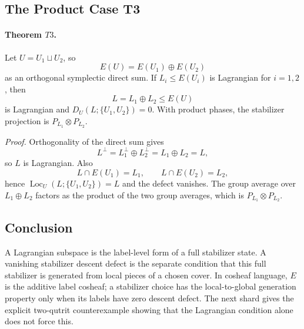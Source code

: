 \subsection{The Product Case T3}

\paragraph{Theorem \(T3\).}
Let \(U=U_1\sqcup U_2\), so
\[
  E(U)=E(U_1)\oplus E(U_2)
\]
as an orthogonal symplectic direct sum.  If \(L_i\leq E(U_i)\) is Lagrangian
for \(i=1,2\), then
\[
  L=L_1\oplus L_2\leq E(U)
\]
is Lagrangian and \(D_U(L;\{U_1,U_2\})=0\).  With product phases, the
stabilizer projection is \(P_{L_1}\otimes P_{L_2}\).

\emph{Proof.}
Orthogonality of the direct sum gives
\[
  L^\perp=L_1^\perp\oplus L_2^\perp=L_1\oplus L_2=L,
\]
so \(L\) is Lagrangian.  Also
\[
  L\cap E(U_1)=L_1,\qquad L\cap E(U_2)=L_2,
\]
hence \(\operatorname{Loc}_U(L;\{U_1,U_2\})=L\) and the defect vanishes.  The
group average over \(L_1\oplus L_2\) factors as the product of the two group
averages, which is \(P_{L_1}\otimes P_{L_2}\).

\subsection{Conclusion}

A Lagrangian subspace is the label-level form of a full stabilizer state.  A
vanishing stabilizer descent defect is the separate condition that this full
stabilizer is generated from local pieces of a chosen cover.  In cosheaf
language, \(E\) is the additive label cosheaf; a stabilizer choice has the
local-to-global generation property only when its labels have zero descent
defect.  The next shard gives the explicit two-qutrit counterexample showing
that the Lagrangian condition alone does not force this.
